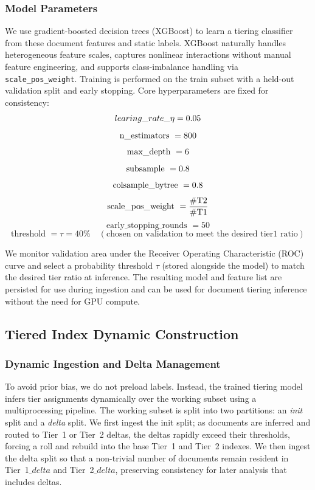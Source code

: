 \documentclass[11pt]{article}
\begin{document}
\subsubsection{Model Parameters}
We use gradient-boosted decision trees (XGBoost) to learn a tiering classifier from these document features and static labels. XGBoost naturally handles heterogeneous feature scales, captures nonlinear interactions without manual feature engineering, and supports class-imbalance handling via \texttt{scale\_pos\_weight}. Training is performed on the train subset with a held-out validation split and early stopping. Core hyperparameters are fixed for consistency:
\[
learing\_rate\_\eta = 0.05 \\
\]
\[
\text{n\_estimators } = 800 \\
\]
\[
\text{max\_depth } = 6 \\
\]
\[
\text{subsample } = 0.8 \\
\]
\[
\text{colsample\_bytree } = 0.8 \\
\]
\[
\text{scale\_pos\_weight } = \frac{\#\text{T2}}{\#\text{T1}} \\
\]
\[
\text{early\_stopping\_rounds } = 50
\]
\[
\text{threshold } = \tau = 40\% \quad (\text{chosen on validation to meet the desired tier1 ratio})
\]

We monitor validation area under the Receiver Operating Characteristic (ROC) curve and select a probability threshold $\tau$ (stored alongside the model) to match the desired tier ratio at inference. The resulting model and feature list are persisted for use during ingestion and can be used for document tiering inference without the need for GPU compute.

\subsection{Tiered Index Dynamic Construction}
\subsubsection{Dynamic Ingestion and Delta Management}
To avoid prior bias, we do not preload labels. Instead, the trained tiering model infers tier assignments dynamically over the working subset using a multiprocessing pipeline. The working subset is split into two partitions: an \emph{init} split and a \emph{delta} split. We first ingest the init split; as documents are inferred and routed to Tier~1 or Tier~2 deltas, the deltas rapidly exceed their thresholds, forcing a roll and rebuild into the base Tier~1 and Tier~2 indexes. We then ingest the delta split so that a non-trivial number of documents remain resident in Tier~1$\_delta$ and Tier~2$\_delta$, preserving consistency for later analysis that includes deltas.
\end{document}
